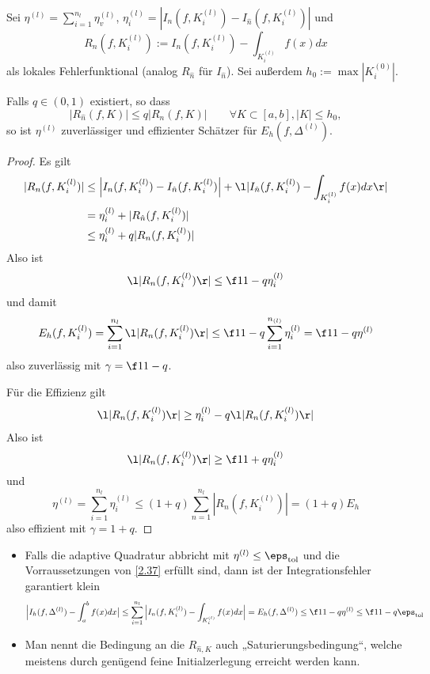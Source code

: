 \documentclass[11pt]{scrbook}
\begin{document}
\begin{st}
	\label{2.37}
	Sei $\eta^{(l)} = \sum_{i=1}^{n_l} \eta_v^{(l)}$, $\eta_i^{(l)} = | I_n(f, K_i^{(l)}) - I_{\hat n}(f, K_i^{(l)})|$ und
	\[
		R_n (f, K_i^{(l)}) := I_n(f,K_i^{(l)}) - \int_{K_i^{(l)}} f(x) dx
	\]
	als lokales Fehlerfunktional (analog $R_{\hat n}$ für $I_{\hat n}$).
	Sei außerdem $h_0 := \max |K_i^{(0)}|$.

	Falls $q \in (0,1)$ existiert, so dass
	\[
		| R_{\hat n}(f,K)| \le q |R_n(f,K)|
		\qquad \forall K\subset [a,b], |K| \le h_0,
	\]
	so ist $\eta^{(l)}$ zuverlässiger und effizienter Schätzer für $E_h(f,\Delta^{(l)})$.
	\begin{proof}
		Es gilt
		\begin{align*}
			|R_n(f,K_i^{(l)})|
			&\le \Big|I_n(f,K_i^{(l)}) - I_{\hat n}(f,K_i^{(l)}) \Big| + \l|I_{\hat n}(f,K_i^{(l)}) - \int_{K_i^{(l)}}f(x) dx \r| \\
			&= \eta_i^{(l)} + |R_{\hat n}(f,K_i^{(l)}) | \\
			&\le \eta_i^{(l)} + q |R_n(f,K_i^{(l)})|
		\end{align*}
		Also ist
		\[
			\l|R_n(f,K_i^{(l)})\r| \le \f 1{1-q} \eta_i^{(l)}
		\]
		und damit
		\begin{align*}
			E_h(f, K_i^{(l)}) = \sum_{i=1}^{n_{l}} \l|R_n(f, K_i^{(l)}) \r| \le \f 1{1-q} \sum_{i=1}^{n_{(l)}} \eta_i^{(l)} = \f 1{1-q} \eta^{(l)}
		\end{align*}
		also zuverlässig mit $\gamma = \f 1{1-q}$.

		Für die Effizienz gilt
		\begin{align*}
			\l|R_n(f, K_i^{(l)}) \r| 
			&\ge \eta_i^{(l)} - q \l| R_n(f, K_i^{(l)}) \r| \\
		\end{align*}
		Also ist
		\[
			\l|R_n(f, K_i^{(l)})\r| \ge \f 1{1+q} \eta_i^{(l)}
		\]
		und
		\[
			\eta^{(l)} = \sum_{i=1}^{n_{l}}{\eta_i^{(l)}} \le (1+q) \sum_{n=1}^{n_{l}} | R_n(f, K_i^{(l)}) | = (1+q) E_h
		\]
		also effizient mit $\gamma = 1+q$.
	\end{proof}
	\begin{note}
		\begin{itemize}
			\item
				Falls die adaptive Quadratur abbricht mit $\eta^{(l)} \le \eps_{\text{tol}}$ und die Vorraussetzungen von \ref{2.37} erfüllt sind, dann ist der Integrationsfehler garantiert klein
				\[
					\Big| I_h(f,\Delta^{(l)}) - \int_a^b f(x) dx \big|
					\le \sum_{i=1}^{n_{l}} \Big| I_n(f,K_i^{(l)}) - \int_{K_i^{(l)}} f(x) dx \Big|
					= E_h(f,\Delta^{(l)})
					\le \f 1{1-q} \eta^{(l)}
					\le \f 1{1-q} \eps_{\text{tol}}
				\]
			\item
				Man nennt die Bedingung an die $R_{\hat n, K}$ auch „Saturierungsbedingung“, welche meistens durch genügend feine Initialzerlegung erreicht werden kann.


\end{itemize}
\end{note}
\end{st}
\end{document}
